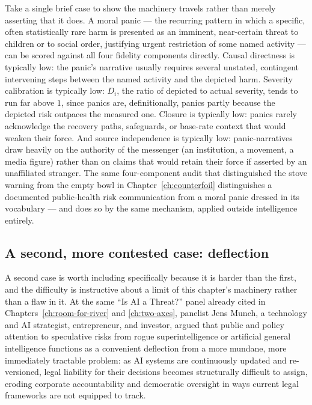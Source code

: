 Take a single brief case to show the machinery travels rather than merely asserting that it does. A moral panic --- the recurring pattern in which a specific, often statistically rare harm is presented as an imminent, near-certain threat to children or to social order, justifying urgent restriction of some named activity --- can be scored against all four fidelity components directly. Causal directness is typically low: the panic's narrative usually requires several unstated, contingent intervening steps between the named activity and the depicted harm. Severity calibration is typically low: $D_i$, the ratio of depicted to actual severity, tends to run far above $1$, since panics are, definitionally, panics partly because the depicted risk outpaces the measured one. Closure is typically low: panics rarely acknowledge the recovery paths, safeguards, or base-rate context that would weaken their force. And source independence is typically low: panic-narratives draw heavily on the authority of the messenger (an institution, a movement, a media figure) rather than on claims that would retain their force if asserted by an unaffiliated stranger. The same four-component audit that distinguished the stove warning from the empty bowl in Chapter~\ref{ch:counterfoil} distinguishes a documented public-health risk communication from a moral panic dressed in its vocabulary --- and does so by the same mechanism, applied outside intelligence entirely.

\subsection*{A second, more contested case: deflection}

A second case is worth including specifically because it is harder than the first, and the difficulty is instructive about a limit of this chapter's machinery rather than a flaw in it. At the same ``Is AI a Threat?'' panel already cited in Chapters~\ref{ch:room-for-river} and \ref{ch:two-axes}, panelist Jens Munch, a technology and AI strategist, entrepreneur, and investor, argued that public and policy attention to speculative risks from rogue superintelligence or artificial general intelligence functions as a convenient deflection from a more mundane, more immediately tractable problem: as AI systems are continuously updated and re-versioned, legal liability for their decisions becomes structurally difficult to assign, eroding corporate accountability and democratic oversight in ways current legal frameworks are not equipped to track.

